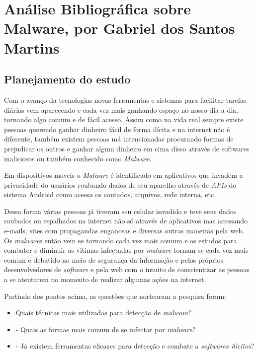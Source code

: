 \chapter{Análise Bibliográfica sobre Malware, por Gabriel dos Santos Martins\label{chap:bibliometria:gsmartins96}}

\section{Planejamento do estudo}

Com o avanço da tecnologias novas ferramentas e sistemas para facilitar tarefas diárias vem aparecendo e cada vez mais ganhando espaço no nosso dia a dia, tornando algo comum e de fácil acesso. Assim como na vida real sempre existe pessoas querendo ganhar dinheiro fácil de forma ilícita e na internet não é diferente, também existem pessoas má intencionadas procurando formas de prejudicar os outros e ganhar algum dinheiro em cima disso através de softwares maliciosos ou também conhecido como \textit{Malware}. 

Em dispositivos moveis o \textit{Malware} é identificado em aplicativos que invadem a privacidade do usuários roubando dados de seu aparelho através de \textit{APIs} do sistema {Android} como acessa os contados, arquivos, rede interna, etc. 

Dessa forma várias pessoas já tiveram seu celular invadido e teve seus dados roubados ou espalhados na internet não só através de aplicativos mas acessando e-mails, sites com propagandas enganosas e diversas outras maneiras pela web. Os \textit{malware}s então vem se tornando cada vez mais comum e os estudos para combater e diminuir as vitimas infectadas por \textit{malware} tornam-se cada vez mais comum e debatido no meio de segurança da informação e pelos próprios desenvolvedores de \textit{software} e pela web com o intuito de conscientizar as pessoas a se atentarem no momento de realizar algumas ações na internet.

Partindo dos pontos acima, as questões que nortearam a pesquisa foram:
\begin{itemize}
    \item Quais técnicas mais utilizadas para detecção de \textit{malware}?
    \item 	- Quais as formas mais comum de se infectar por \textit{malware}?
    \item 	- Já existem ferramentas eficazes para detecção e combate a \textit{softwares ilícitos}?
\end{itemize}

